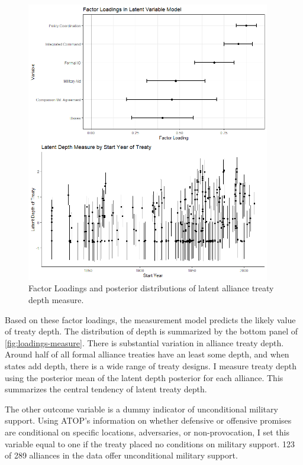 \documentclass[12pt]{article}
\begin{document}
\begin{figure}[hbtp]
\centering
\includegraphics[width=0.95\textwidth]{../figures/loadings-measure.png}
\caption{Factor Loadings and posterior distributions of latent alliance treaty depth measure.}
\label{fig:loadings-measure}
\end{figure}


Based on these factor loadings, the measurement model predicts the likely value of treaty depth. 
The distribution of depth is summarized by the bottom panel of \autoref{fig:loadings-measure}. 
There is substantial variation in alliance treaty depth. 
Around half of all formal alliance treaties have an least some depth, and when states add depth, there is a wide range of treaty designs.
I measure treaty depth using the posterior mean of the latent depth posterior for each alliance. 
This summarizes the central tendency of latent treaty depth. 


The other outcome variable is a dummy indicator of unconditional military support. 
Using ATOP's information on whether defensive or offensive promises are conditional on specific locations, adversaries, or non-provocation, I set this variable equal to one if the treaty placed no conditions on military support.
123 of 289 alliances in the data offer unconditional military support. 
\end{document}
